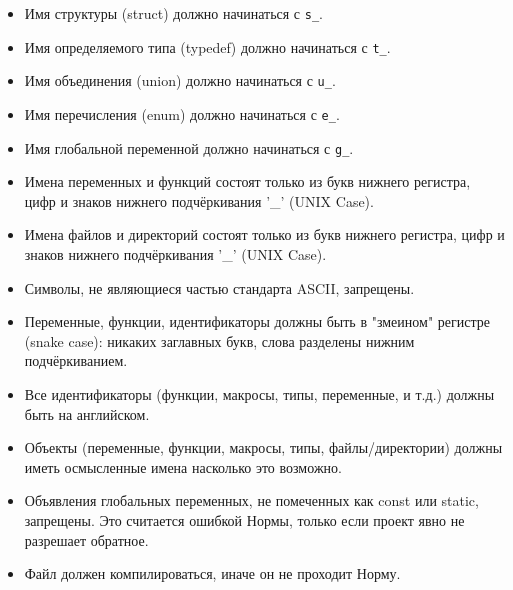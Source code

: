 \documentclass{42-ru}
\begin{document}
        \begin{itemize}

            \item Имя структуры (struct) должно начинаться с \texttt{s\_}.

            \item Имя определяемого типа (typedef) должно начинаться с \texttt{t\_}.

            \item Имя объединения (union) должно начинаться с \texttt{u\_}.

            \item Имя перечисления (enum) должно начинаться с \texttt{e\_}.

            \item Имя глобальной переменной должно начинаться с \texttt{g\_}.

            \item Имена переменных и функций состоят только из букв нижнего регистра,
                  цифр и знаков нижнего подчёркивания '\_' (UNIX Case).

            \item Имена файлов и директорий состоят только из букв нижнего регистра,
                  цифр и знаков нижнего подчёркивания '\_' (UNIX Case).

            \item Символы, не являющиеся частью стандарта ASCII, запрещены.

            \item Переменные, функции, идентификаторы должны быть в "змеином" регистре (snake case):
                  никаких заглавных букв, слова разделены нижним подчёркиванием.

            \item Все идентификаторы (функции, макросы, типы, переменные, и т.д.) должны быть на английском.

            \item Объекты (переменные, функции, макросы, типы, файлы/директории) должны иметь осмысленные имена
                  насколько это возможно.

            \item Объявления глобальных переменных, не помеченных как const или static, запрещены.
                  Это считается ошибкой Нормы, только если проект явно не разрешает обратное.

            \item Файл должен компилироваться, иначе он не проходит Норму.
        \end{itemize}
\newpage
\end{document}
